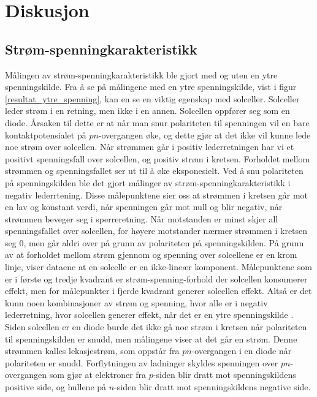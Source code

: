 \documentclass[%
 reprint,
 amsmath,amssymb,
 aps,
 norsk,
 booktabs
]{revtex4-1}
\begin{document}
\section{Diskusjon}
\subsection{Strøm-spenningkarakteristikk}
Målingen av strøm-spenningkarakteristikk ble gjort med og uten en ytre spenningskilde. Fra å se på målingene med en ytre spenningskilde, vist i figur \vref{resultat_ytre_spenning}, kan en se en viktig egenskap med solceller. Solceller leder strøm i en retning, men ikke i en annen. Solcellen oppfører seg som en diode. Årsaken til dette er at når man snur polariteten til spenningen vil en bare kontaktpotensialet på $pn$-overgangen øke, og dette gjør at det ikke vil kunne lede noe strøm over solcellen. Når strømmen går i positiv lederretningen har vi et positivt spenningsfall over solcellen, og positiv strøm i kretsen. Forholdet mellom strømmen og spenningsfallet ser ut til å øke eksponesielt. Ved å snu polariteten på spenningskilden ble det gjort målinger av strøm-spenningkarakteristikk i negativ lederrtening. Disse målepunktene sier oss at strømmen i kretsen går mot en lav og konstant verdi, når spenningen går mot null og blir negativ, når strømmen beveger seg i sperreretning. Når motstanden er minst skjer all spenningsfallet over solcellen, for høyere motstander nærmer strømmen i kretsen seg $0$, men går aldri over på grunn av polariteten på spenningskilden. På grunn av at forholdet mellom strøm gjennom og spenning over solcellene er en krom linje, viser dataene at en solcelle er en ikke-lineær komponent. Målepunktene som er i første og tredje kvadrant er strøm-spenning-forhold der solcellen konsumerer effekt, men for målepunkter i fjerde kvadrant generer solcellen effekt. Altså er det kunn noen kombinasjoner av strøm og spenning, hvor alle er i negativ lederretning, hvor solcellen generer effekt, når det er en ytre spenningskilde \cite{torbj}. \\Siden solcellen er en diode burde det ikke gå noe strøm i kretsen når polariteten til spenningskilden er snudd, men målingene viser at det går en strøm. Denne strømmen kalles lekasjestrøm, som oppstår fra $pn$-overgangen i en diode når polariteten er snudd. Forflytningen av ladninger skyldes spenningen over $pn$-overgangen som gjør at elektroner fra $p$-siden blir dratt mot spenningskildens positive side, og hullene på $n$-siden blir dratt mot spenningskildens negative side. \par
\end{document}
